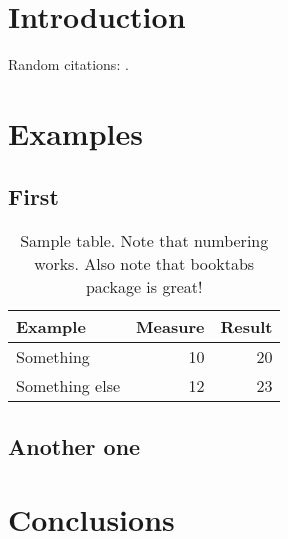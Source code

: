 
\begin{abstract}
\lipsum[1]
\end{abstract}

\section{Introduction}
\lipsum[10]
Random citations: \cite{Kuchlin2000, Sinz2003}.

\section{Examples}
\lipsum[3]

\subsection{First}
\lipsum
\begin{table}
\centering
\caption{Sample table. Note that numbering works. Also note that booktabs package is great!}
\begin{tabular}{l r r}
\toprule
Example & Measure & Result \\
\midrule
Something & 10 & 20 \\
Something else & 12 & 23 \\
\bottomrule
\end{tabular}
\end{table}

\subsection{Another one}
\lipsum[10]

\section{Conclusions}
